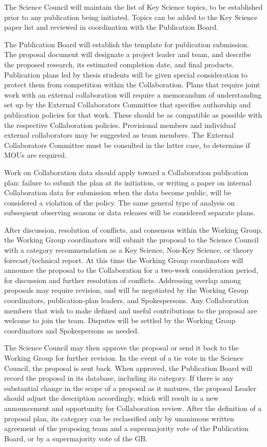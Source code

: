\documentclass[12pt]{article}
\begin{document}
The Science Council will maintain the list of Key Science topics, to be established prior to any publication being initiated.  Topics can be added to the Key Science paper list and reviewed in coordination with the Publication Board.

The Publication Board will establish the template for publication submission.  The proposal document will designate a project leader and team, and describe the proposed research, its estimated completion date, and final products.  
Publication plans led by thesis students will be given special consideration to protect them from competition within the Collaboration. Plans that require joint work with an external collaboration will require a memorandum of understanding set up by the External Collaborators Committee that specifies authorship and publication policies for that work.  These should be as compatible as possible with the respective Collaboration policies.  Provisional members and individual external collaborators may be suggested as team members.  The External Collaborators Committee must be consulted in the latter case, to determine if MOUs are required.  

Work on Collaboration data should apply toward a Collaboration publication plan: failure to submit the plan at its initiation, or writing a paper on internal Collaboration data for submission when the data become public, will be considered a violation of the policy.  The same general type of analysis on subsequent observing seasons or data releases will be considered separate plans.

After discussion, resolution of conflicts, and consensus within the Working Group, the Working Group coordinators will submit the proposal to the Science Council with a category recommendation as a Key Science, Non-Key Science, or theory forecast/technical report.  At this time the Working Group coordinators will announce the proposal to the Collaboration for a two-week consideration period, for discussion and further resolution of conflicts. Addressing overlap among proposals may require revision, and will be negotiated by the Working Group coordinators, publication-plan leaders, and Spokespersons.  Any Collaboration members that wish to make defined and useful contributions to the proposal are welcome to join the team.  Disputes will be settled by the Working Group coordinators and Spokespersons as needed.  

The Science Council may then approve the proposal or send it back to the Working Group for further revision. In the event of a tie vote in the Science Council, the proposal is sent back. When approved, the Publication Board will record the proposal in its database, including its category. If there is any substantial change in the scope of a proposal as it matures, the proposal Leader should adjust the description accordingly, which will result in a new announcement and opportunity for Collaboration review.  After the definition of a proposal plan, its category can be reclassified only by unanimous written agreement of the proposing team and a supermajority vote of the Publication Board, or by a supermajority vote of the GB.
\end{document}
